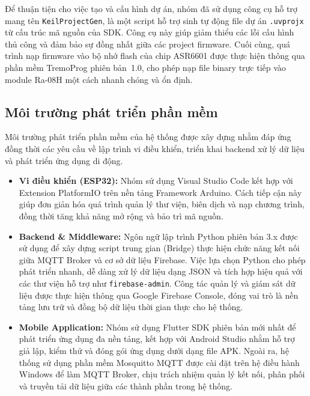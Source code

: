 Để thuận tiện cho việc tạo và cấu hình dự án, nhóm đã sử dụng công cụ hỗ trợ mang tên
\texttt{KeilProjectGen}, là một script hỗ trợ sinh tự động file dự án
\texttt{.uvprojx} từ cấu trúc mã nguồn của SDK. Công cụ này giúp giảm thiểu các lỗi
cấu hình thủ công và đảm bảo sự đồng nhất giữa các project firmware.
Cuối cùng, quá trình nạp firmware vào bộ nhớ flash của chip ASR6601 được thực hiện
thông qua phần mềm TremoProg phiên bản~1.0, cho phép nạp file binary trực tiếp
vào module Ra-08H một cách nhanh chóng và ổn định.


\subsection{Môi trường phát triển phần mềm}
Môi trường phát triển phần mềm của hệ thống được xây dựng nhằm đáp ứng đồng thời các yêu cầu về lập trình vi điều khiển, triển khai backend xử lý dữ liệu và phát triển ứng dụng di động. 

\begin{itemize}
    \item \textbf{Vi điều khiển (ESP32):} Nhóm sử dụng Visual Studio Code kết hợp với Extension PlatformIO trên nền tảng Framework Arduino. Cách tiếp cận này giúp đơn giản hóa quá trình quản lý thư viện, biên dịch và nạp chương trình, đồng thời tăng khả năng mở rộng và bảo trì mã nguồn.
    \item \textbf{Backend \& Middleware:} Ngôn ngữ lập trình Python phiên bản 3.x được sử dụng để xây dựng script trung gian (Bridge) thực hiện chức năng kết nối giữa MQTT Broker và cơ sở dữ liệu Firebase. Việc lựa chọn Python cho phép phát triển nhanh, dễ dàng xử lý dữ liệu dạng JSON và tích hợp hiệu quả với các thư viện hỗ trợ như \texttt{firebase-admin}. Công tác quản lý và giám sát dữ liệu được thực hiện thông qua Google Firebase Console, đóng vai trò là nền tảng lưu trữ và đồng bộ dữ liệu thời gian thực cho hệ thống.
    
    \item \textbf{Mobile Application:} Nhóm sử dụng Flutter SDK phiên bản mới nhất để phát triển ứng dụng đa nền tảng, kết hợp với Android Studio nhằm hỗ trợ giả lập, kiểm thử và đóng gói ứng dụng dưới dạng file APK. Ngoài ra, hệ thống sử dụng phần mềm Mosquitto MQTT được cài đặt trên hệ điều hành Windows để làm MQTT Broker, chịu trách nhiệm quản lý kết nối, phân phối và truyền tải dữ liệu giữa các thành phần trong hệ thống.
\end{itemize}

